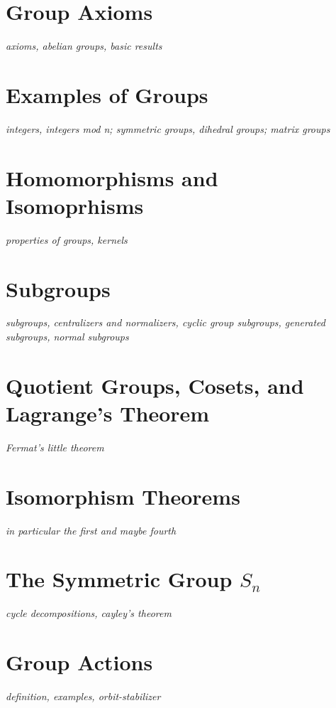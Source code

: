 \documentclass[../../../main.tex]{subfiles}
\begin{document}

\section{Group Axioms}
\textit{axioms, abelian groups, basic results}
\section{Examples of Groups}
\textit{integers, integers mod n; symmetric groups, dihedral groups; matrix groups}
\section{Homomorphisms and Isomoprhisms}
\textit{properties of groups, kernels}
\section{Subgroups}
\textit{subgroups, centralizers and normalizers, cyclic group subgroups, generated subgroups, normal subgroups}
\section{Quotient Groups, Cosets, and Lagrange's Theorem}
\textit{Fermat's little theorem}
\section{Isomorphism Theorems}
\textit{in particular the first and maybe fourth}
\section{The Symmetric Group $S_n$}
\textit{cycle decompositions, cayley's theorem}
\section{Group Actions}
\textit{definition, examples, orbit-stabilizer}

\printbibliography[
    heading=subbibintoc,
    title={References}
]
\end{document}

